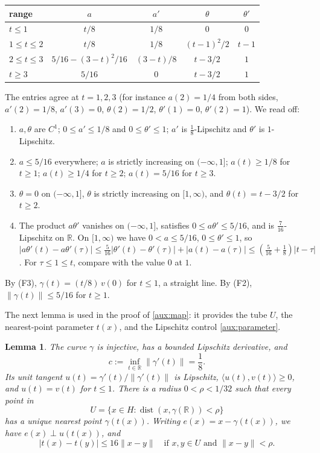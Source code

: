 \documentclass[11pt]{article}
\newcommand{\R}{\mathbb R}
\newcommand{\norm}[1]{\lVert #1\rVert}
\newcommand{\ip}[2]{\langle #1,#2\rangle}
\DeclareMathOperator{\dist}{dist}
\newtheorem{lemma}[theorem]{Lemma}
\theoremstyle{definition}
\numberwithin{equation}{section}
\begin{document}
\begin{center}
\begin{tabular}{lcccc}
\toprule
range & \(a\) & \(a'\) & \(\theta\) & \(\theta'\)\\
\midrule
\(t\le1\) & \(t/8\) & \(1/8\) & \(0\) & \(0\)\\
\(1\le t\le2\) & \(t/8\) & \(1/8\) & \((t-1)^2/2\) & \(t-1\)\\
\(2\le t\le3\) & \(5/16-(3-t)^2/16\) & \((3-t)/8\) & \(t-3/2\) & \(1\)\\
\(t\ge3\) & \(5/16\) & \(0\) & \(t-3/2\) & \(1\)\\
\bottomrule
\end{tabular}
\end{center}
The entries agree at \(t=1,2,3\) (for instance \(a(2)=1/4\) from both
sides, \(a'(2)=1/8\), \(a'(3)=0\), \(\theta(2)=1/2\), \(\theta'(1)=0\),
\(\theta'(2)=1\)). We read off:
\begin{enumerate}[label=(F\arabic*)]
\item \(a,\theta\) are \(C^1\); \(0\le a'\le1/8\) and \(0\le\theta'\le1\);
\(a'\) is \(\tfrac18\)-Lipschitz and \(\theta'\) is \(1\)-Lipschitz.
\item \(a\le5/16\) everywhere; \(a\) is strictly increasing on
\((-\infty,1]\); \(a(t)\ge1/8\) for \(t\ge1\); \(a(t)\ge1/4\) for
\(t\ge2\); \(a(t)=5/16\) for \(t\ge3\).
\item \(\theta=0\) on \((-\infty,1]\), \(\theta\) is strictly increasing on
\([1,\infty)\), and \(\theta(t)=t-3/2\) for \(t\ge2\).
\item The product \(a\theta'\) vanishes on \((-\infty,1]\), satisfies
\(0\le a\theta'\le5/16\), and is \(\tfrac7{16}\)-Lipschitz on \(\R\).
On \([1,\infty)\) we have \(0<a\le5/16\), \(0\le\theta'\le1\), so
\(|a\theta'(t)-a\theta'(\tau)|\le\tfrac5{16}|\theta'(t)-\theta'(\tau)|
+|a(t)-a(\tau)|\le(\tfrac5{16}+\tfrac18)|t-\tau|\). For
\(\tau\le1\le t\), compare with the value \(0\) at \(1\).
\end{enumerate}
By (F3), \(\gamma(t)=(t/8)\,v(0)\) for \(t\le1\), a straight line. By (F2),
\(\norm{\gamma(t)}\le5/16\) for \(t\ge1\).

The next lemma is used in the proof of \cref{aux:map}: it provides the tube
\(U\), the nearest-point parameter \(t(x)\), and the Lipschitz control
\eqref{aux:parameter}.

\begin{lemma}\label{aux:tube}
The curve \(\gamma\) is injective, has a bounded Lipschitz derivative, and
\[
 c:=\inf_{t\in\R}\norm{\gamma'(t)}=\frac18.
\]
Its unit tangent \(u(t)=\gamma'(t)/\norm{\gamma'(t)}\) is Lipschitz,
\(\ip{u(t)}{v(t)}\ge0\), and \(u(t)=v(t)\) for \(t\le1\).
There is a radius \(0<\rho<1/32\) such that every point in
\[
 U=\{x\in H:\dist(x,\gamma(\R))<\rho\}
\]
has a unique nearest point \(\gamma(t(x))\). Writing
\(e(x)=x-\gamma(t(x))\), we have \(e(x)\perp u(t(x))\), and
\begin{equation}\label{aux:parameter}
 |t(x)-t(y)|\le16\norm{x-y}
 \quad\text{if }x,y\in U\text{ and }\norm{x-y}<\rho.
\end{equation}
\end{lemma}
\end{document}
